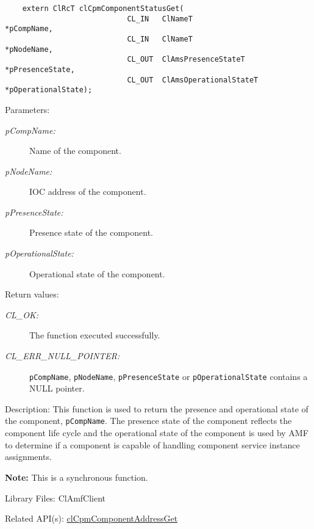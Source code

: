 {\begin{Desc}
\footnotesize\begin{verbatim}    extern ClRcT clCpmComponentStatusGet(
                  			CL_IN   ClNameT                 *pCompName,
                  			CL_IN   ClNameT                 *pNodeName,
                  			CL_OUT  ClAmsPresenceStateT     *pPresenceState,
                  			CL_OUT  ClAmsOperationalStateT  *pOperationalState);
\end{verbatim}
\normalsize
\end{Desc}
\begin{Desc}
\item[Parameters:]
\begin{description}
\item[{\em p\-Comp\-Name:}]Name of the component. 
\item[{\em p\-Node\-Name:}]IOC address of the component. 
\item[{\em p\-Presence\-State:}]Presence state of the component. 
\item[{\em p\-Operational\-State:}]Operational state of the component.\end{description}
\end{Desc}
\begin{Desc}
\item[Return values:]
\begin{description}
\item[{\em CL\_\-OK:}]The function executed successfully. 
\item[{\em CL\_\-ERR\_\-NULL\_\-POINTER:}]{\tt{pCompName}}, {\tt{pNodeName}}, {\tt{pPresenceState}} or 
{\tt{pOperationalState}} contains a NULL pointer.\end{description}
\end{Desc}
\begin{Desc}
\item[Description:]This function is used to return the presence and operational state of the component, {\tt{p\-Comp\-Name}}. The presence state of the
component reflects the component life cycle and the operational state of the component is used by AMF to determine if a component is capable of handling 
component service instance assignments.\end{Desc}
{\bf Note:} This is a synchronous function.
\begin{Desc}
\item[Library Files:]Cl\-Amf\-Client\end{Desc}

\begin{Desc}
\item[Related API(s):]\hyperlink{group__group14}{cl\-Cpm\-Component\-Address\-Get} \end{Desc}
\newpage



}
